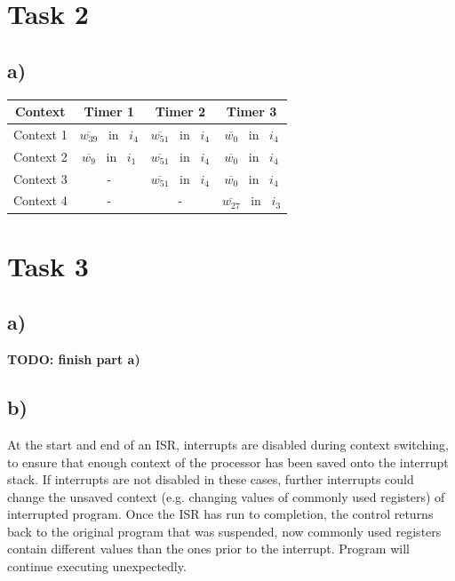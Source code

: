 \documentclass[10pt,a4paper]{article}
\begin{document}
\section*{Task 2}
\subsection*{a)}
\begin{tabular}{|c|c|c|c|}
\hline
    Context & Timer 1 & Timer 2 & Timer 3 \\
    \hline
    Context 1 & $\overline{w_{39}}$ ~in ~$i_4$ & $\overline{w_{51}}$ ~in ~$i_4$ & $\overline{w_0}$ ~in ~$i_4$ \\
    \hline
    Context 2 & $\overline{w_{9}}$ ~in ~$i_1$ &  $\overline{w_{51}}$ ~in ~$i_4$ & $\overline{w_0}$ ~in ~$i_4$ \\
    \hline
    Context 3 & - &  $\overline{w_{51}}$ ~in ~$i_4$ & $\overline{w_0}$ ~in ~$i_4$ \\
    \hline
    Context 4 & - & - &  $\overline{w_{27}}$ ~in ~$i_3$\\
    \hline
\end{tabular}

\section*{Task 3}

\subsection*{a)}
\textbf{TODO: finish part a)}
\subsection*{b)}
At the start and end of an ISR, interrupts are disabled during context switching, to ensure that enough context of the processor has been saved onto the interrupt stack. If interrupts are not disabled in these cases, further interrupts could change the unsaved context (e.g. changing values of commonly used registers) of interrupted program. Once the ISR  has  run to completion, the control returns back to the original program that was suspended, now commonly used registers contain different values than the ones prior to the interrupt. Program will continue executing unexpectedly.
\end{document}
